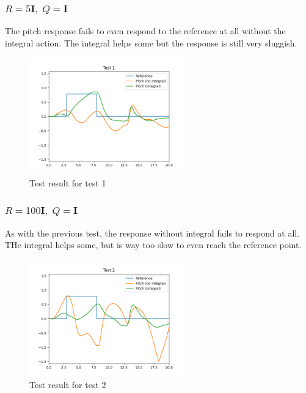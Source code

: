 \subsubsection*{$R = 5\mathbf{I},\; Q=\mathbf{I}$}
The pitch response fails to even respond to the reference at all without the integral action. The integral helps some but the response is still very sluggish.
\begin{figure}[H]
	\centering
	\includegraphics[width=0.6\textwidth]{figures/lab2-test1.png}
	\caption{Test result for test 1}
	\label{}
\end{figure}

\subsubsection*{$R = 100\mathbf{I},\; Q=\mathbf{I}$}
As with the previous test, the response without integral fails to respond at all. THe integral helps some, but is way too slow to even reach the reference point.
\begin{figure}[H]
	\centering
	\includegraphics[width=0.6\textwidth]{figures/lab2-test2.png}
	\caption{Test result for test 2}
	\label{}
\end{figure}

